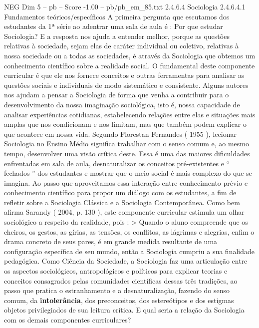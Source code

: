 \begin{textsample}{NEG Dim 5 – pb – Score -1.00 – pb/pb\_em\_85.txt}  \label{ex:f5_neg_194}
2.4.6.4 Sociologia 2.4.6.4.1 Fundamentos teóricos/específicos A primeira pergunta que escutamos dos estudantes da 1ª série ao adentrar uma sala de aula é : Por que estudar Sociologia?
E a resposta nos ajuda a entender melhor, porque as questões relativas à sociedade, sejam elas de caráter individual ou coletivo, relativas à nossa sociedade ou a todas as sociedades, é através da Sociologia que obtemos um conhecimento científico sobre a realidade social.
O fundamental deste componente curricular é que ele nos fornece conceitos e outras ferramentas para analisar as questões sociais e individuais de modo sistemático e consistente.
Alguns autores nos ajudam a pensar a Sociologia de forma que venha a contribuir para o desenvolvimento da nossa imaginação sociológica, isto é, nossa capacidade de analisar experiências cotidianas, estabelecendo relações entre elas e situações mais amplas que nos condicionam e nos limitam, mas que também podem explicar o que acontece em nossa vida.
Segundo Florestan Fernandes ( 1955 ), lecionar Sociologia no Ensino Médio significa trabalhar com o senso comum e, ao mesmo tempo, desenvolver uma visão crítica deste.
Essa é uma das maiores dificuldades enfrentadas em sala de aula, desnaturalizar os conceitos pré-existentes e “ fechados ” dos estudantes e mostrar que o meio social é mais complexo do que se imagina.
Ao passo que aproveitamos essa interação entre conhecimento prévio e conhecimento científico para propor um diálogo com os estudantes, a fim de refletir sobre a Sociologia Clássica e a Sociologia Contemporânea.
Como bem afirma Sarandy ( 2004, p. 130 ), este componente curricular estimula um olhar sociológico a respeito da realidade, pois : > Quando o aluno compreende que os cheiros, os gestos, as gírias, as tensões, os conflitos, as lágrimas e alegrias, enfim o drama concreto de seus pares, é em grande medida resultante de uma configuração específica de seu mundo, então a Sociologia cumpriu a sua finalidade pedagógica.
Como Ciência da Sociedade, a Sociologia faz uma articulação entre os aspectos sociológicos, antropológicos e políticos para explicar teorias e conceitos consagrados pelas comunidades científicas dessas três tradições, ao passo que pratica o estranhamento e a desnaturalização, fazendo do senso comum, da \textbf{intolerância}, dos preconceitos, dos estereótipos e dos estigmas objetos privilegiados de sua leitura crítica.
E qual seria a relação da Sociologia com os demais componentes curriculares?

\end{textsample}
